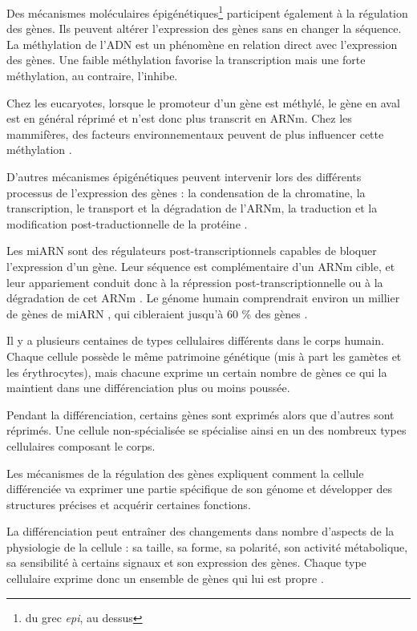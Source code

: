       Des mécanismes moléculaires épigénétiques\footnote{du grec \emph{epi}, au dessus} participent également à la régulation des gènes.
      Ils peuvent altérer l'expression des gènes sans en changer la séquence.
      La méthylation de l'\acs{ADN} est un phénomène en relation direct avec l'expression des gènes.
      Une faible méthylation favorise la transcription mais une forte méthylation, au contraire, l'inhibe.

      Chez les eucaryotes, lorsque le promoteur d'un gène est méthylé, le gène en aval est en général réprimé et n'est donc plus transcrit en \acs{ARNm}.
      Chez les mammifères, des facteurs environnementaux peuvent de plus influencer cette méthylation \citep{Szyf2011}.

      D'autres mécanismes épigénétiques peuvent intervenir lors des différents processus de l'expression des gènes : la condensation de la chromatine, la transcription, le transport et la dégradation de l'\acs{ARNm}, la traduction et la modification post-traductionnelle de la protéine \citep{Reik2007, Rosenfeld2009, Jia2012}.

      Les \ac{miARN} sont des régulateurs post-transcriptionnels capables de bloquer l'expression d'un gène.
      Leur séquence est complémentaire d'un \acs{ARNm} cible, et leur appariement conduit donc à la répression post-transcriptionnelle ou à la dégradation de cet \acs{ARNm} \citep{Kusenda2006, Bartel2009}.
      Le génome humain comprendrait environ un millier de gènes de \ac{miARN} \citep{Bentwich2005}, qui cibleraient jusqu'à 60 \% des gènes \citep{Lewis2005, Friedman2009}.

      Il y a plusieurs centaines de types cellulaires différents dans le corps humain.
      Chaque cellule possède le même patrimoine génétique (mis à part les gamètes et les érythrocytes), mais chacune exprime un certain nombre de gènes ce qui la maintient dans une différenciation plus ou moins poussée.

      Pendant la différenciation, certains gènes sont exprimés alors que d'autres sont réprimés.
      Une cellule non-spécialisée se spécialise ainsi en un des nombreux types cellulaires composant le corps.

      Les mécanismes de la régulation des gènes expliquent comment la cellule différenciée va exprimer une partie spécifique de son génome et développer des structures précises et acquérir certaines fonctions.

      La différenciation peut entraîner des changements dans nombre d'aspects de la physiologie de la cellule : sa taille, sa forme, sa polarité, son activité métabolique, sa sensibilité à certains signaux et son expression des gènes.
      Chaque type cellulaire exprime donc un ensemble de gènes qui lui est propre \citep{Goring2012, Wirth2011, Li2012c}.

